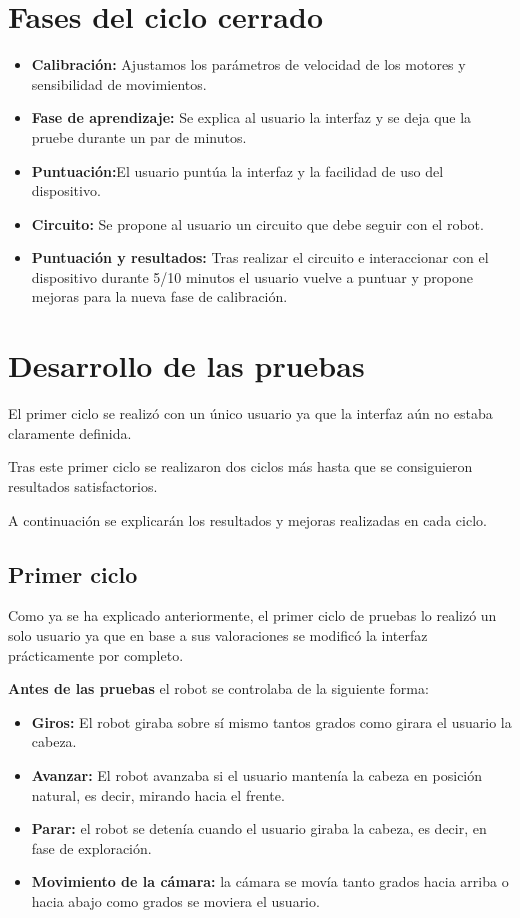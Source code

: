 \documentclass[twoside, 11pt]{epstfg}
\begin{document}
\section{Fases del ciclo cerrado}
\begin{itemize}
	\item \textbf{Calibración:} Ajustamos los parámetros de velocidad de los motores y sensibilidad de movimientos.
	\item \textbf{Fase de aprendizaje:} Se explica al usuario la interfaz y se deja que la pruebe durante un par de minutos.
	\item \textbf{Puntuación:}El usuario puntúa la interfaz y la facilidad de uso del dispositivo.
	\item \textbf{Circuito:} Se propone al usuario un circuito que debe seguir con el robot.
	\item \textbf{Puntuación y resultados:} Tras realizar el circuito e interaccionar con el dispositivo durante 5/10 minutos el usuario vuelve a puntuar y propone mejoras para la nueva fase de calibración.
\end{itemize}


\section{Desarrollo de las pruebas}
El primer ciclo se realizó con un único usuario ya que la interfaz aún no estaba claramente definida.

Tras este primer ciclo se realizaron dos ciclos más hasta que se consiguieron resultados satisfactorios.

A continuación se explicarán los resultados y mejoras realizadas en cada ciclo.

\subsection{Primer ciclo}

Como ya se ha explicado anteriormente, el primer ciclo de pruebas lo realizó un solo usuario ya que en base a sus valoraciones se modificó la interfaz prácticamente por completo.

\textbf{Antes de las pruebas} el robot se controlaba de la siguiente forma:
\begin{itemize}
	\item \textbf{Giros:} El robot giraba sobre sí mismo tantos grados como girara el usuario la cabeza.
	\item \textbf{Avanzar:} El robot avanzaba si el usuario mantenía la cabeza en posición natural, es decir, mirando hacia el frente.
	\item \textbf{Parar:} el robot se detenía cuando el usuario giraba la cabeza, es decir, en fase de exploración.
	\item \textbf{Movimiento de la cámara:} la cámara se movía tanto grados hacia arriba o hacia abajo como grados se moviera el usuario.
\end{itemize}
\end{document}
